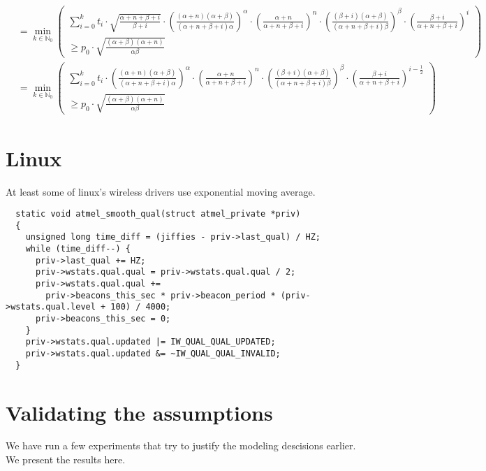 \documentclass[10pt,a4paper]{article}
\begin{document}
\begin{align*}
                      & = \min_{k \in \mathbb{N}_{0}} \left( \begin{array}{r} \sum_{i = 0}^{k} t_{i} \cdot \sqrt{\frac{\alpha + n + \beta + i}{\beta + i}} \cdot \left( \frac{(\alpha + n)(\alpha + \beta)}{(\alpha + n + \beta + i)\alpha} \right)^{\alpha} \cdot \left( \frac{\alpha + n}{\alpha + n + \beta + i} \right)^{n} \cdot \left( \frac{(\beta + i)(\alpha + \beta)}{(\alpha + n + \beta + i)\beta} \right)^{\beta} \cdot \left( \frac{\beta + i}{\alpha + n + \beta + i} \right)^{i}\\ \ge p_{0} \cdot \sqrt{\frac{(\alpha + \beta)(\alpha + n)}{\alpha\beta}} \end{array} \right)\\
                      & = \min_{k \in \mathbb{N}_{0}} \left( \begin{array}{r} \sum_{i = 0}^{k} t_{i} \cdot \left( \frac{(\alpha + n)(\alpha + \beta)}{(\alpha + n + \beta + i)\alpha} \right)^{\alpha} \cdot \left( \frac{\alpha + n}{\alpha + n + \beta + i} \right)^{n} \cdot \left( \frac{(\beta + i)(\alpha + \beta)}{(\alpha + n + \beta + i)\beta} \right)^{\beta} \cdot \left( \frac{\beta + i}{\alpha + n + \beta + i} \right)^{i - \frac{1}{2}}\\ \ge p_{0} \cdot \sqrt{\frac{(\alpha + \beta)(\alpha + n)}{\alpha\beta}} \end{array} \right)
\end{align*}

\section{Linux}

At least some of linux's wireless drivers use exponential moving average.

\begin{verbatim}
  static void atmel_smooth_qual(struct atmel_private *priv)
  {
    unsigned long time_diff = (jiffies - priv->last_qual) / HZ;
    while (time_diff--) {
      priv->last_qual += HZ;
      priv->wstats.qual.qual = priv->wstats.qual.qual / 2;
      priv->wstats.qual.qual +=
        priv->beacons_this_sec * priv->beacon_period * (priv->wstats.qual.level + 100) / 4000;
      priv->beacons_this_sec = 0;
    }
    priv->wstats.qual.updated |= IW_QUAL_QUAL_UPDATED;
    priv->wstats.qual.updated &= ~IW_QUAL_QUAL_INVALID;
  }
\end{verbatim}

\section{Validating the assumptions}
We have run a few experiments that try to justify the modeling descisions earlier. We present the results here.
\end{document}
